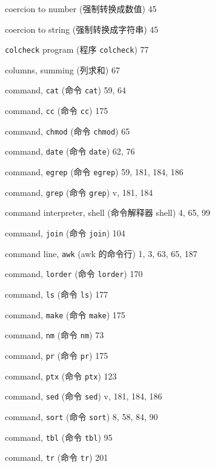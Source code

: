 \begin{multicols}{2}
\hangindent=2pc  coercion to number (强制转换成数值) 45

\hangindent=2pc  coercion to string (强制转换成字符串) 45

\hangindent=2pc  \verb'colcheck' program (程序 \verb'colcheck') 77

\hangindent=2pc  columns, summing (列求和) 67

\hangindent=2pc  command, \verb'cat' (命令 \verb'cat') 59, 64

\hangindent=2pc  command, \verb'cc' (命令 \verb'cc') 175

\hangindent=2pc  command, \verb'chmod' (命令 \verb'chmod') 65

\hangindent=2pc  command, \verb'date' (命令 \verb'date') 62, 76

\hangindent=2pc  command, \verb'egrep' (命令 \verb'egrep')
59, 181, 184,  186

\hangindent=2pc  command, \verb'grep' (命令 \verb'grep') v, 181, 184

\hangindent=2pc  command interpreter, shell (命令解释器 shell)
4, 65,  99

\hangindent=2pc  command, \verb'join' (命令 \verb'join') 104

\hangindent=2pc  command line, \verb'awk' (awk 的命令行) 1, 3, 63, 65, 187

\hangindent=2pc  command, \verb'lorder' (命令 \verb'lorder') 170

\hangindent=2pc  command, \verb'ls' (命令 \verb'ls') 177

\hangindent=2pc  command, \verb'make' (命令 \verb'make') 175

\hangindent=2pc  command, \verb'nm' (命令 \verb'nm') 73

\hangindent=2pc  command, \verb'pr' (命令 \verb'pr') 175

\hangindent=2pc  command, \verb'ptx' (命令 \verb'ptx') 123

\hangindent=2pc  command, \verb'sed' (命令 \verb'sed') 
v, 181, 184, 186

\hangindent=2pc  command, \verb'sort' (命令 \verb'sort') 8, 58, 84, 90

\hangindent=2pc  command, \verb'tbl' (命令 \verb'tbl') 95

\hangindent=2pc  command, \verb'tr' (命令 \verb'tr') 201


\end{multicols}
